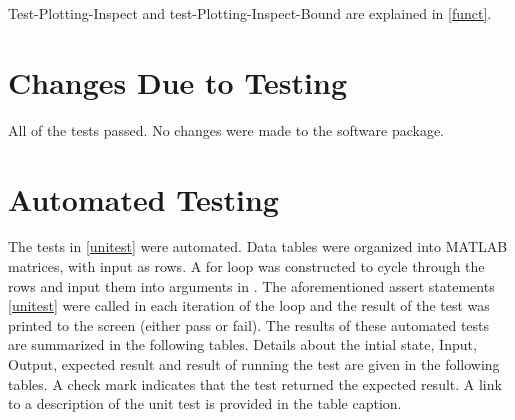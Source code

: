 \documentclass[12pt, titlepage]{article}
\begin{document}
\noindent
Test-Plotting-Inspect and test-Plotting-Inspect-Bound are explained in 
\ref{funct}. 

\section{Changes Due to Testing} 

All of the tests passed. No changes were made to the software package.

\section{Automated Testing} \label{automation} 

The tests in \ref{unitest} were automated. Data tables were organized into 
MATLAB matrices, with input as rows. A for loop was constructed to cycle 
through the rows and input them into arguments in \progname. The aforementioned 
assert statements \ref{unitest} were called in each iteration of the loop and 
the result of the test was printed to the screen (either pass or fail). 
The results of 
these automated tests are summarized in the following tables. Details about the 
intial state, Input, Output, expected result and result of running the
test are given in the following tables. A check mark indicates that the test 
returned the expected result. A link to a description of the unit test is 
provided in the table caption.
\end{document}
